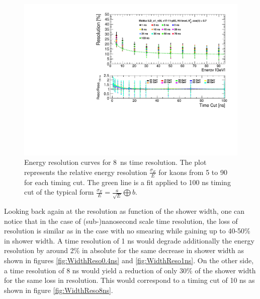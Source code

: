 \begin{figure}[htbp!]
  \centering
  \includegraphics[width=0.7\linewidth]{../Thesis_Plots/ILD/Smearing_8ns/Plots/ShowerResoAbsolute_TimeCuts_Smearing3}
  \caption{Energy resolution curves for \SI{8}{\nano\second} time resolution. The plot represents the relative energy resolution $\frac{\sigma_{E}}{E}$ for kaons from 5 to 90 \GeV for each timing cut. The green line is a fit applied to 100 ns timing cut of the typical form $\frac{\sigma_{E}}{E} = \frac{a}{\sqrt{E}} \bigoplus b$.}  \label{fig:Reso8ns}
\end{figure}

Looking back again at the resolution as function of the shower width, one can notice that in the case of (sub-)nanosecond scale time resolution, the loss of resolution is similar as in the case with no smearing while gaining up to 40-50\% in shower width. A time resolution of 1 ns would degrade additionally the energy resolution by around 2\% in absolute for the same decrease in shower width as shown in figures \ref{fig:WidthReso0.4ns} and \ref{fig:WidthReso1ns}. On the other side, a time resolution of 8 ns would yield a reduction of only 30\% of the shower width for the same loss in resolution. This would correspond to a timing cut of 10 ns as shown in figure \ref{fig:WidthReso8ns}.\\

